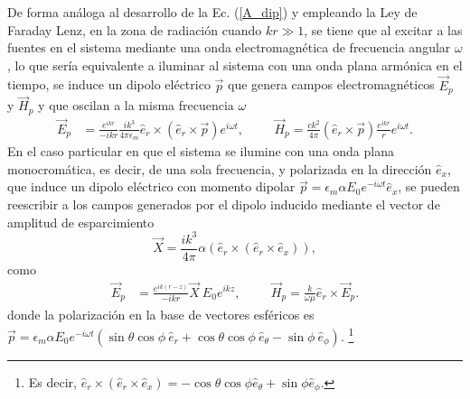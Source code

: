  De forma análoga al desarrollo de la Ec. (\ref{A_dip}) y empleando la Ley de Faraday Lenz, en la zona de radiación cuando $kr\gg 1$, se tiene que al excitar a las fuentes en el sistema mediante una onda electromagnética de frecuencia angular $\omega$, lo que sería equivalente a iluminar al sistema con una onda plana armónica en el tiempo, se induce un dipolo eléctrico $\Vec{p}$ que genera campos electromagnéticos $\Vec{E}_p$ y $\Vec{H}_p$ y  que oscilan a la misma frecuencia $\omega$ 
\begin{align}
    \Vec{E}_p&=\frac{e^{ikr}}{-ikr}\frac{ik^3}{4\pi\epsilon_m}\hat{e}_r\times(\hat{e}_r\times \Vec{p}) e^{i\omega t}, \hspace{1cm}
    \Vec{H}_p=\frac{ck^2}{4\pi}(\hat{e}_r\times\Vec{p})\frac{e^{ikr}}{r}e^{i\omega t}.
\end{align}
En el caso particular en que el sistema se ilumine con una onda plana monocromática, es decir, de una sola frecuencia, y polarizada en la dirección $\hat{e}_x$, que induce un dipolo eléctrico con momento dipolar  $\Vec{p}=\epsilon_m \alpha E_0 e^{-i\omega t}\hat{e}_x$, se pueden reescribir a los campos generados por el dipolo inducido mediante el vector de amplitud de esparcimiento
\begin{equation}
	\Vec{X}=\frac{ik^3}{4\pi}\alpha \left( \hat{e}_r\times(\hat{e}_r\times \hat{e}_x)\right),
	\label{Xvec}
\end{equation}
como
 \begin{align}
 	\Vec{E}_{p}&=\frac{e^{ik(r-z)}}{-ikr}\Vec{X}\:E_0 e^{ikz},
 	\hspace{1cm}
 	\Vec{H}_{p}=\frac{k}{\omega\mu}\hat{e}_r\times\Vec{E}_{p}.
 	\label{EH_s}
 \end{align}
donde la polarización en la base de vectores esféricos es $\Vec{p}=\epsilon_m \alpha E_0 e^{-i\omega t}(\sin\theta\cos\phi\: \hat{e}_r+\cos\theta\cos\phi\: \hat{e}_{\theta}-\sin\phi \:\hat{e}_{\phi})$. \footnote{Es decir, $\hat{e}_r\times(\hat{e}_r\times \hat{e}_x)=-\cos\theta\cos\phi \hat{e}_{\theta}+\sin\phi \hat{e}_{\phi}$. } \\

